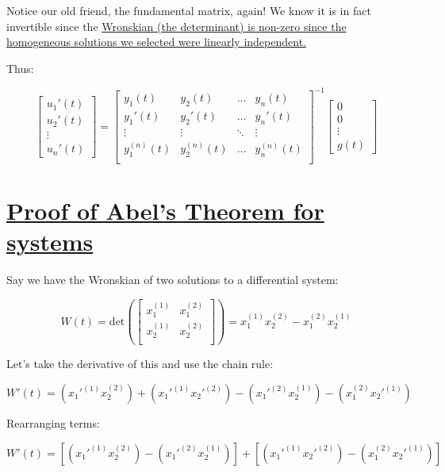 \documentclass{report}
\begin{document}
Notice our old friend, the fundamental matrix, again! We know it is in fact invertible since the \hyperref[th:EqLinInd]{Wronskian (the determinant) is non-zero since the homogeneous solutions we selected were linearly independent.}

Thus:

$$
\begin{bmatrix}
    u_1'(t) \\
    u_2'(t) \\
    \vdots \\ 
    u_n'(t)
\end{bmatrix}
=
\begin{bmatrix}
    y_1(t) & y_2(t) & \dots  & y_n(t) \\
    y_1'(t) & y_2'(t) & \dots  & y_n'(t) \\
    \vdots & \vdots & \ddots & \vdots \\
    y_1^{(n)}(t) & y_2^{(n)}(t) & \dots  & y_n^{(n)}(t) \\
\end{bmatrix}^{-1}
\begin{bmatrix}
    0 \\
    0 \\
    \vdots \\ 
    g(t)
\end{bmatrix}
$$

\section{\hyperref[th:wronAbelSys]{Proof of Abel's Theorem for systems}}
\label{sec:wronAbelSys}

Say we have the Wronskian of two solutions to a differential system:

$$
W(t) =
\text{det}\left(
\begin{bmatrix}
    x_1^{(1)} & x_1^{(2)} \\
    x_2^{(1)} & x_2^{(2)} \\
\end{bmatrix}\right)
=x_1^{(1)}x_2^{(2)}-x_1^{(2)}x_2^{(1)}
$$

Let's take the derivative of this and use the chain rule:

$$W'(t) = (x_1'^{(1)}x_2^{(2)}) + (x_1'^{(1)}x_2'^{(2)}) - (x_1'^{(2)}x_2^{(1)}) - (x_1^{(2)}x_2'^{(1)})$$

Rearranging terms:

$$W'(t) = [(x_1'^{(1)}x_2^{(2)}) 
- (x_1'^{(2)}x_2^{(1)})]
+ [(x_1'^{(1)}x_2'^{(2)})  - (x_1^{(2)}x_2'^{(1)})]$$
\end{document}

